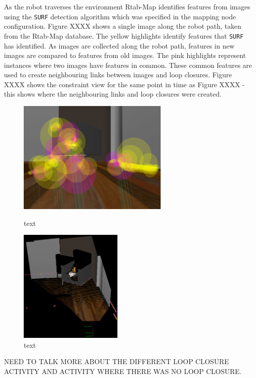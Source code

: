 \documentclass[a4paper]{article}
\begin{document}
As the robot traverses the environment Rtab-Map identifies features from images using the \texttt{SURF} detection algorithm which was specified in the mapping node configuration. Figure XXXX shows a single image along the robot path, taken from the Rtab-Map database. The yellow highlights identify features that \texttt{SURF} has identified. As images are collected along the robot path, features in new images are compared to features from old images. The pink highlights represent instances where two images have features in common. These common features are used to create neighbouring links between images and loop closures. Figure XXXX shows the constraint view for the same point in time as Figure XXXX - this shows where the neighbouring links and loop closures were created.
\begin{figure}[h]
\centering
\begin{minipage}[t]{0.45\textwidth}
\centering
\includegraphics[height=5.5cm]{kitchen_features}
\caption{text}
\end{minipage}
\hspace{1cm}
\begin{minipage}[t]{0.45\textwidth}
\centering
\includegraphics[height=5.5cm]{kitchen_constraints}
\caption{text}
\end{minipage}
\end{figure}

NEED TO TALK MORE ABOUT THE DIFFERENT LOOP CLOSURE ACTIVITY AND ACTIVITY WHERE THERE WAS NO LOOP CLOSURE.
\end{document}
